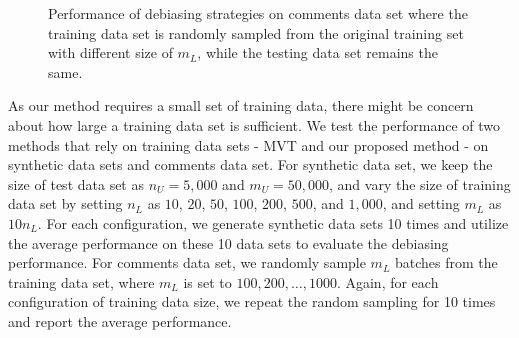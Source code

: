 \begin{figure}[!t]
  \centering
  \caption{\label{fig:trainratio_lnkd}
  Performance of debiasing strategies on comments data set 
  where the training data set is randomly sampled from the original training set with different size of $m_L$, 
  while the testing data set remains the same.  
  }
\end{figure}

As our method requires a small set of training data, 
there might be concern about how large a training data set is sufficient.  
We test the performance of two methods that rely on training data sets - MVT and our proposed method - 
on synthetic data sets and comments data set.  
For synthetic data set, we keep the size of test data set as $n_U=5,000$ and $m_U=50,000$, 
and vary the size of training data set by setting $n_L$ as $10$, $20$, $50$, $100$, $200$, $500$, and $1,000$, 
and setting $m_L$ as $10 n_L$.  
For each configuration, we generate synthetic data sets 10 times 
and utilize the average performance on these 10 data sets to evaluate the debiasing performance.  
For comments data set, we randomly sample $m_L$ batches from the training data set, 
where $m_L$ is set to $100, 200, \ldots, 1000$.  
Again, for each configuration of training data size, 
we repeat the random sampling for 10 times and report the average performance.  

